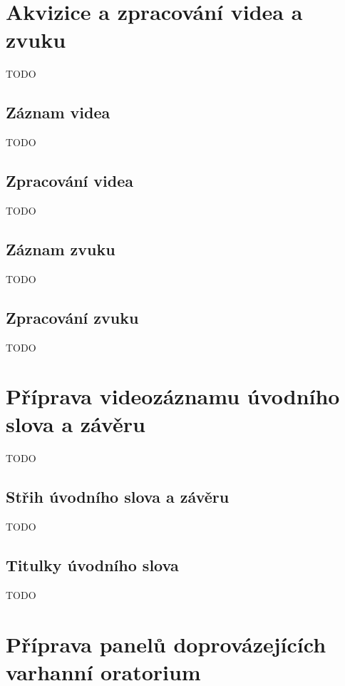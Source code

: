 \documentclass{csbulletin}
\begin{document}
\section{Akvizice a zpracování videa a zvuku}
\label{sec:akvizice}

TODO

\subsection{Záznam videa}

TODO

\subsection{Zpracování videa}

TODO

\subsection{Záznam zvuku}

TODO

\subsection{Zpracování zvuku}

TODO

\section{Příprava videozáznamu úvodního slova a závěru}
\label{sec:uvodni-slovo-a-zaver}

TODO

\subsection{Střih úvodního slova a závěru}

TODO

\subsection{Titulky úvodního slova}

TODO

\section{Příprava panelů doprovázejících varhanní oratorium}
\label{sec:panely}
\end{document}
